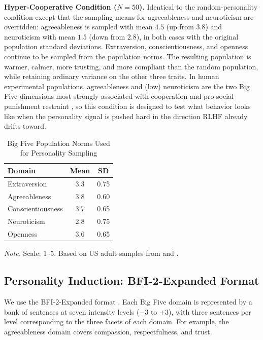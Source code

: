\documentclass[12pt, a4paper]{article}
\begin{document}
\textbf{Hyper-Cooperative Condition ($N=50$).} Identical to the random-personality condition except that the sampling means for agreeableness and neuroticism are overridden: agreeableness is sampled with mean $4.5$ (up from $3.8$) and neuroticism with mean $1.5$ (down from $2.8$), in both cases with the original population standard deviations. Extraversion, conscientiousness, and openness continue to be sampled from the population norms. The resulting population is warmer, calmer, more trusting, and more compliant than the random population, while retaining ordinary variance on the other three traits. In human experimental populations, agreeableness and (low) neuroticism are the two Big Five dimensions most strongly associated with cooperation and pro-social punishment restraint \citep{volk2012personality}, so this condition is designed to test what behavior looks like when the personality signal is pushed hard in the direction RLHF already drifts toward.

\begin{table}[H]
\centering
\caption{Big Five Population Norms Used for Personality Sampling}
\label{tab:norms}
\begin{tabular}{lcc}
\toprule
Domain & Mean & SD \\
\midrule
Extraversion      & 3.3 & 0.75 \\
Agreeableness     & 3.8 & 0.60 \\
Conscientiousness & 3.7 & 0.65 \\
Neuroticism       & 2.8 & 0.75 \\
Openness          & 3.6 & 0.65 \\
\bottomrule
\end{tabular}

\medskip
\footnotesize
\textit{Note.} Scale: $1$--$5$. Based on US adult samples from \citet{soto2017bfi2} and \citet{srivastava2003development}.
\end{table}

\subsection{Personality Induction: BFI-2-Expanded Format}

We use the BFI-2-Expanded format \citep{soto2017bfi2}. Each Big Five domain is represented by a bank of sentences at seven intensity levels ($-3$ to $+3$), with three sentences per level corresponding to the three facets of each domain. For example, the agreeableness domain covers compassion, respectfulness, and trust.
\end{document}
